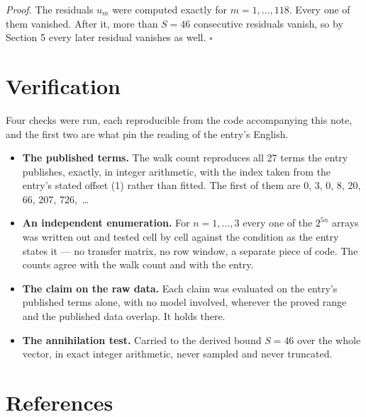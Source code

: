 \documentclass[11pt]{article}
\theoremstyle{definition}
\begin{document}
{\itshape Proof.} The residuals $u_m$ were computed exactly for $m = 1,\dots,118$. Every one of them vanished. After it, more than $S = 46$ consecutive residuals vanish, so by Section 5 every later residual vanishes as well. $\square$

\section{Verification}

Four checks were run, each reproducible from the code accompanying this note, and the first two are what pin the reading of the entry's English.

\begin{itemize}

\item {\bfseries The published terms.} The walk count reproduces all 27 terms the entry publishes, exactly, in integer arithmetic, with the index taken from the entry's stated offset (1) rather than fitted. The first of them are 0, 3, 0, 8, 20, 66, 207, 726,~\dots

\item {\bfseries An independent enumeration.} For $n = 1,\dots,3$ every one of the $2^{5n}$ arrays was written out and tested cell by cell against the condition as the entry states it --- no transfer matrix, no row window, a separate piece of code. The counts agree with the walk count and with the entry.

\item {\bfseries The claim on the raw data.} Each claim was evaluated on the entry's published terms alone, with no model involved, wherever the proved range and the published data overlap. It holds there.

\item {\bfseries The annihilation test.} Carried to the derived bound $S = 46$ over the whole vector, in exact integer arithmetic, never sampled and never truncated.

\end{itemize}

\section{References}
\end{document}

